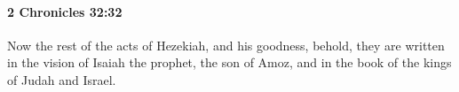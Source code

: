 
		\paragraph{2 Chronicles 32:32} %
			\label{2CHRONICLES-32-32}

			Now the rest of the acts of Hezekiah, and his goodness, behold, they are written in the vision of Isaiah the prophet, the son of Amoz, and in the book of the kings of Judah and Israel.


